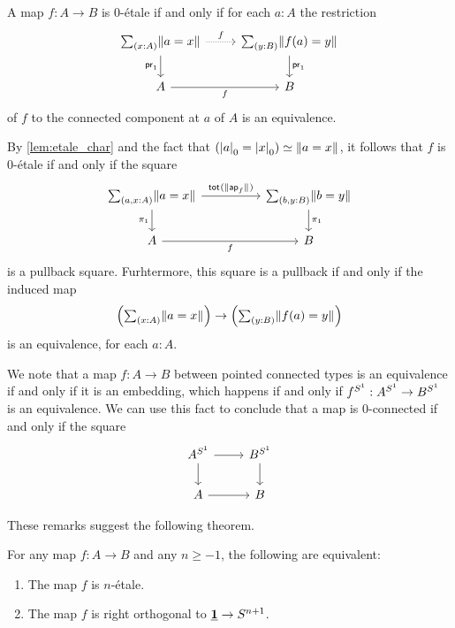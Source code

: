 \documentclass[9pt,twosided]{amsart}
\begin{document}
\begin{rmk}
A map $f:A\to B$ is $0$-\'etale if and only if for each $a:A$ the restriction
\begin{equation*}
\begin{tikzcd}
\sm{x:A}\brck{a=x} \arrow[d,swap,"\proj 1"] \arrow[r,densely dotted,"f"] & \sm{y:B}\brck{f(a)=y} \arrow[d,"\proj 1"] \\
A \arrow[r,swap,"f"] & B
\end{tikzcd}
\end{equation*}
of $f$ to the connected component at $a$ of $A$ is an equivalence.

By \cref{lem:etale_char} and the fact that $\eqv{(\tproj{0}{a}=\tproj{0}{x})}{\brck{a=x}}$, it follows that $f$ is $0$-\'etale if and only if the square
\begin{equation*}
\begin{tikzcd}[column sep=huge]
\sm{a,x:A}\brck{a=x} \arrow[d,swap,"\pi_1"] \arrow[r,"\total{\brck{\apfunc{f}}}"] & \sm{b,y:B}\brck{b=y} \arrow[d,"\pi_1"] \\
A \arrow[r,swap,"f"] & B
\end{tikzcd}
\end{equation*}
is a pullback square. Furhtermore, this square is a pullback if and only if the induced map
\begin{equation*}
\Big(\sm{x:A}\brck{a=x}\Big)\to\Big(\sm{y:B}\brck{f(a)=y}\Big)
\end{equation*}
is an equivalence, for each $a:A$.

We note that a map $f:A\to B$ between pointed connected types is an equivalence if and only if it is an embedding, which happens if and only if $f^{S^{1}}:A^{S^{1}} \to B^{S^{1}}$ is an equivalence. We can use this fact to conclude that a map is $0$-connected if and only if the square
    \begin{equation*}
      \begin{tikzcd}
        A^{\sphere{1}} \arrow[r] \arrow[d] & B^{\sphere{1}} \arrow[d] \\
        A \arrow[r] & B
      \end{tikzcd}
    \end{equation*}
\end{rmk}

These remarks suggest the following theorem.

\begin{thm}
  \label{thm:char_n_etale}
  For any map $f:A\to B$ and any $n\geq -1$, the following are equivalent:
  \begin{enumerate}
  \item The map $f$ is $n$-\'etale.
  \item The map $f$ is right orthogonal to $\underline{\mathbf{1}}\to S^{n+1}$.
  \end{enumerate}
\end{thm}
\end{document}
